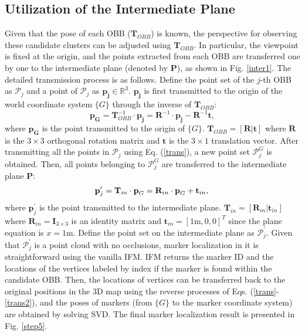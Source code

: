 \subsection{Utilization of the Intermediate Plane}
Given that the pose of each OBB ($\mathbf{T}_{OBB}$) is known, the perspective for observing these candidate clusters can be adjusted using $\mathbf{T}_{OBB}$. 
%
In particular, the viewpoint is fixed at the origin, and the points extracted from each OBB are transferred one by one to the intermediate plane (denoted by $\mathbf{P}$), as shown in Fig. \ref{inter1}.
%
The detailed transmission process is as follows. Define the point set of the $j$-th OBB as $\mathcal{P}_{j}$ and a point of $\mathcal{P}_{j}$ as $\mathbf{{p}_{j}}\in \mathbb{R}^{3}$. $\mathbf{{p}_{j}}$ is first transmitted to the origin of the world coordinate system $\{G\}$ through the inverse of $\mathbf{T}_{OBB}$:
	\begin{equation}	
			\mathbf{{p}_{G}}  = \mathbf{T}_{OBB}^{-1} \cdot \mathbf{{p}_{j}}= \mathbf{R}^{-1} \cdot \mathbf{{p}_{j}}-\mathbf{R}^{-1}\mathbf{t}, 
		\label{trans}
	\end{equation}
where $\mathbf{{p}_{G}}$ is the point transmitted to the origin of $\{G\}$. $\mathbf{T}_{OBB} = [\mathbf{R}|\mathbf{t}]$ where $\mathbf{R}$ is the $3 \times 3$ orthogonal rotation matrix and $\mathbf{t}$ is the $3 \times 1$ translation vector. After transmitting all the points in $\mathcal{P}_{j}$ using Eq. (\ref{trans}), a new point set $\mathcal{P}^{G}_{j}$ is obtained. Then, all points belonging to $\mathcal{P}^{G}_{j}$ are transferred to the intermediate plane $\mathbf{P}$:
	\begin{equation}	
			\textbf{p}^{\prime}_{j} = \mathbf{T}_{in} \cdot \textbf{p}_{G}=\mathbf{R}_{in} \cdot \textbf{p}_{G}+\mathbf{t}_{in}, \\
		\label{trans2}
	\end{equation}
where $\textbf{p}^{\prime}_{j}$ is the point transmitted to the intermediate plane. $\mathbf{T}_{in} = [\mathbf{R}_{in}|\mathbf{t}_{in}]$ where $\mathbf{R}_{in} = \mathbf{I}_{3 \times 3}$ is an identity matrix and $\mathbf{t}_{in} = [1 \mathrm{m}, 0, 0]^{T} $ since the plane equation is $x=1 \mathrm{m}$. Define the point set on the intermediate plane as $\mathcal{P}^{\prime}_{j}$. Given that $\mathcal{P}^{\prime}_{j}$ is a point cloud with no occlusions, marker localization in it is straightforward using the vanilla IFM. IFM returns the marker ID and the locations of the vertices labeled by index if the marker is found within the candidate OBB. Then, the locations of vertices can be transferred back to the original positions in the 3D map using the reverse processes of Eqs. (\ref{trans}-\ref{trans2}), and the poses of markers (from $\{G\}$ to the marker coordinate system) are obtained by solving SVD. The final marker localization result is presented in Fig. \ref{step5}. 
